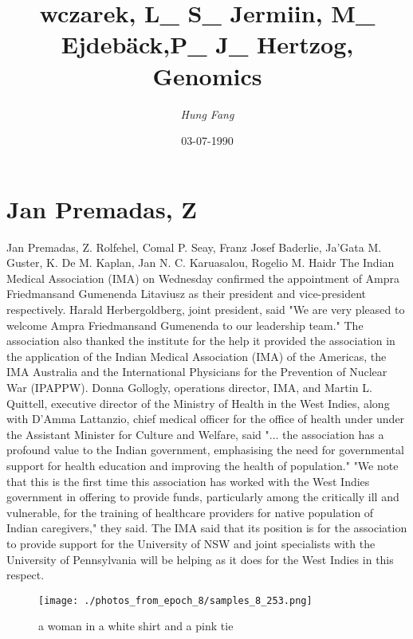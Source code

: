 \documentclass{article}%
\title{wczarek, L\_ S\_ Jermiin, M\_ Ejdebäck,P\_ J\_ Hertzog, Genomics}%
\author{\textit{Hung Fang}}%
\date{03-07-1990}%
\begin{document}
%
\normalsize%
\maketitle%
\section{Jan Premadas, Z}%
\label{sec:JanPremadas,Z}%
Jan Premadas, Z. Rolfehel, Comal P. Seay, Franz Josef Baderlie, Ja'Gata M. Guster, K. De M. Kaplan, Jan N. C. Karuasalou, Rogelio M. Haidr\newline%
The Indian Medical Association (IMA) on Wednesday confirmed the appointment of Ampra Friedmansand Gumenenda Litaviusz as their president and vice{-}president respectively.\newline%
Harald Herbergoldberg, joint president, said "We are very pleased to welcome Ampra Friedmansand Gumenenda to our leadership team."\newline%
The association also thanked the institute for the help it provided the association in the application of the Indian Medical Association (IMA) of the Americas, the IMA Australia and the International Physicians for the Prevention of Nuclear War (IPAPPW).\newline%
Donna Gollogly, operations director, IMA, and Martin L. Quittell, executive director of the Ministry of Health in the West Indies, along with D'Amma Lattanzio, chief medical officer for the office of health under under the Assistant Minister for Culture and Welfare, said "... the association has a profound value to the Indian government, emphasising the need for governmental support for health education and improving the health of population."\newline%
"We note that this is the first time this association has worked with the West Indies government in offering to provide funds, particularly among the critically ill and vulnerable, for the training of healthcare providers for native population of Indian caregivers," they said.\newline%
The IMA said that its position is for the association to provide support for the University of NSW and joint specialists with the University of Pennsylvania will be helping as it does for the West Indies in this respect.\newline%

%


\begin{figure}[h!]%
\centering%
\texttt{[image: ./photos\_from\_epoch\_8/samples\_8\_253.png]}%
\caption{a woman in a white shirt and a pink tie}%
\end{figure}

%
\end{document}
